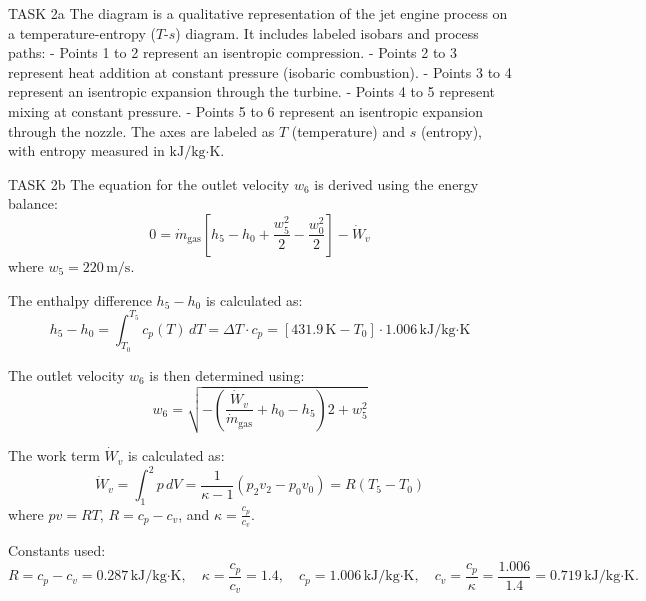 TASK 2a  
The diagram is a qualitative representation of the jet engine process on a temperature-entropy (\( T \)-\( s \)) diagram. It includes labeled isobars and process paths:  
- Points 1 to 2 represent an isentropic compression.  
- Points 2 to 3 represent heat addition at constant pressure (isobaric combustion).  
- Points 3 to 4 represent an isentropic expansion through the turbine.  
- Points 4 to 5 represent mixing at constant pressure.  
- Points 5 to 6 represent an isentropic expansion through the nozzle.  
The axes are labeled as \( T \) (temperature) and \( s \) (entropy), with entropy measured in \( \text{kJ/kg·K} \).  

TASK 2b  
The equation for the outlet velocity \( w_6 \) is derived using the energy balance:  
\[
0 = \dot{m}_{\text{gas}} \left[ h_5 - h_0 + \frac{w_5^2}{2} - \frac{w_0^2}{2} \right] - \dot{W}_v
\]  
where \( w_5 = 220 \, \text{m/s} \).  

The enthalpy difference \( h_5 - h_0 \) is calculated as:  
\[
h_5 - h_0 = \int_{T_0}^{T_5} c_p(T) \, dT = \Delta T \cdot c_p = \left[ 431.9 \, \text{K} - T_0 \right] \cdot 1.006 \, \text{kJ/kg·K}
\]  

The outlet velocity \( w_6 \) is then determined using:  
\[
w_6 = \sqrt{-\left( \frac{\dot{W}_v}{\dot{m}_{\text{gas}}} + h_0 - h_5 \right) 2 + w_5^2}
\]  

The work term \( \dot{W}_v \) is calculated as:  
\[
\dot{W}_v = \int_1^2 p \, dV = \frac{1}{\kappa - 1} \left( p_2 v_2 - p_0 v_0 \right) = R \left( T_5 - T_0 \right)
\]  
where \( p v = R T \), \( R = c_p - c_v \), and \( \kappa = \frac{c_p}{c_v} \).  

Constants used:  
\[
R = c_p - c_v = 0.287 \, \text{kJ/kg·K}, \quad \kappa = \frac{c_p}{c_v} = 1.4, \quad c_p = 1.006 \, \text{kJ/kg·K}, \quad c_v = \frac{c_p}{\kappa} = \frac{1.006}{1.4} = 0.719 \, \text{kJ/kg·K}.
\]  